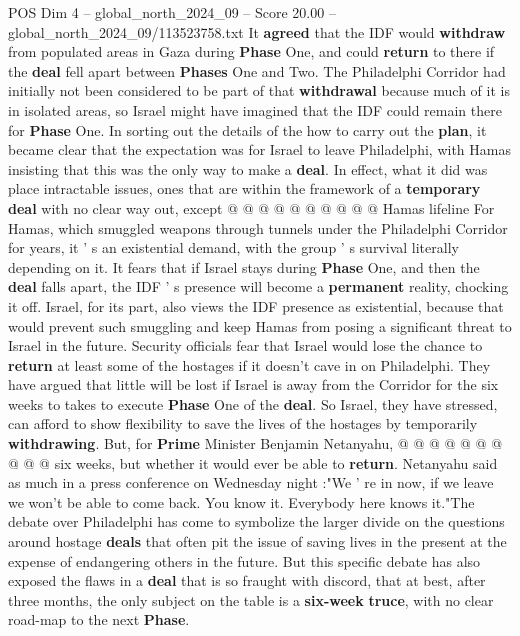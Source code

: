 \begin{textsample}{POS Dim 4 – global\_north\_2024\_09 – Score 20.00 – global\_north\_2024\_09/113523758.txt}
It \textbf{agreed} that the IDF would \textbf{withdraw} from populated areas in Gaza during \textbf{Phase} One, and could \textbf{return} to there if the \textbf{deal} fell apart between \textbf{Phases} One and Two.
The Philadelphi Corridor had initially not been considered to be part of that \textbf{withdrawal} because much of it is in isolated areas, so Israel might have imagined that the IDF could remain there for \textbf{Phase} One.
In sorting out the details of the how to carry out the \textbf{plan}, it became clear that the expectation was for Israel to leave Philadelphi, with Hamas insisting that this was the only way to make a \textbf{deal}.
In effect, what it did was place intractable issues, ones that are within the framework of a \textbf{temporary} \textbf{deal} with no clear way out, except @ @ @ @ @ @ @ @ @ @ Hamas lifeline For Hamas, which smuggled weapons through tunnels under the Philadelphi Corridor for years, it ' s an existential demand, with the group ' s survival literally depending on it.
It fears that if Israel stays during \textbf{Phase} One, and then the \textbf{deal} falls apart, the IDF ' s presence will become a \textbf{permanent} reality, chocking it off.
Israel, for its part, also views the IDF presence as existential, because that would prevent such smuggling and keep Hamas from posing a significant threat to Israel in the future.
Security officials fear that Israel would lose the chance to \textbf{return} at least some of the hostages if it doesn't cave in on Philadelphi.
They have argued that little will be lost if Israel is away from the Corridor for the six weeks to takes to execute \textbf{Phase} One of the \textbf{deal}.
So Israel, they have stressed, can afford to show flexibility to save the lives of the hostages by temporarily \textbf{withdrawing}.
But, for \textbf{Prime} Minister Benjamin Netanyahu, @ @ @ @ @ @ @ @ @ @ six weeks, but whether it would ever be able to \textbf{return}.
Netanyahu said as much in a press conference on Wednesday night :"We ' re in now, if we leave we won't be able to come back.
You know it.
Everybody here knows it."The debate over Philadelphi has come to symbolize the larger divide on the questions around hostage \textbf{deals} that often pit the issue of saving lives in the present at the expense of endangering others in the future.
But this specific debate has also exposed the flaws in a \textbf{deal} that is so fraught with discord, that at best, after three months, the only subject on the table is a \textbf{six-week} \textbf{truce}, with no clear road-map to the next \textbf{Phase}.

\end{textsample}

